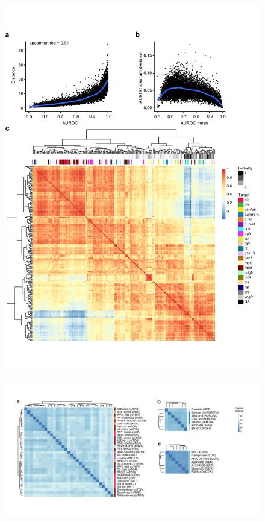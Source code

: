 \begin{flushleft}
\begin{figure}[h]
\centering
\includegraphics[width=\textwidth,
                height=\textheight,
                keepaspectratio]{figures/promise/pdf/fig_3_2.pdf}
\caption{}
\label{fig_232}
\end{figure}
\bigbreak

\begin{figure}[h]
\centering
\includegraphics[width=\textwidth,
                height=\textheight,
                keepaspectratio]{figures/promise/pdf/fig_3_3.pdf}
\caption{}
\label{fig_233}
\end{figure}
\bigbreak






\end{flushleft}
